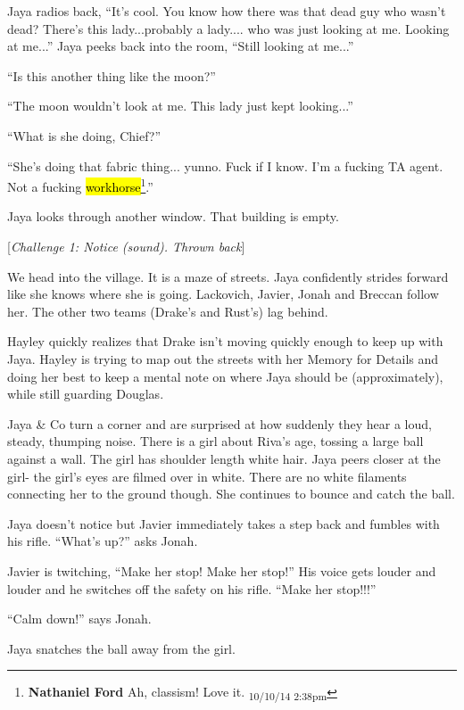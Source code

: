 Jaya radios back, ``It's cool.  You know how there was that dead guy who wasn't dead?  There's this lady...probably a lady.... who was just looking at me.  Looking at me...'' Jaya peeks back into the room, ``Still looking at me...''

``Is this another thing like the moon?''

``The moon wouldn't look at me.  This lady just kept looking...''

``What is she doing, Chief?''

``She's doing that fabric thing... yunno.  Fuck if I know.  I'm a fucking TA agent.  Not a fucking \hl{workhorse}\footnote{\textbf{Nathaniel Ford }Ah, classism! Love it. \textsubscript{10/10/14 2:38pm}}.''

Jaya looks through another window.  That building is empty.

{[}\textit{Challenge 1: Notice (sound).  Thrown back}{]}



We head into the village.  It is a maze of streets.  Jaya confidently strides forward like she knows where she is going.  Lackovich, Javier, Jonah and Breccan follow her.  The other two teams (Drake's and Rust's) lag behind.



Hayley quickly realizes that Drake isn't moving quickly enough to keep up with Jaya.  Hayley is trying to map out the streets with her Memory for Details and doing her best to keep a mental note on where Jaya should be (approximately), while still guarding Douglas.



Jaya \& Co turn a corner and are surprised at how suddenly they hear a loud, steady, thumping noise.  There is a girl about Riva's age, tossing a large ball against a wall.  The girl has shoulder length white hair.  Jaya peers closer at the girl- the girl's eyes are filmed over in white.  There are no white filaments connecting her to the ground though.  She continues to bounce and catch the ball.



Jaya doesn't notice but Javier immediately takes a step back and fumbles with his rifle.  ``What's up?'' asks Jonah.  

Javier is twitching, ``Make her stop!  Make her stop!'' His voice gets louder and louder and he switches off the safety on his rifle.  ``Make her stop!!!''

``Calm down!'' says Jonah.

Jaya snatches the ball away from the girl.

